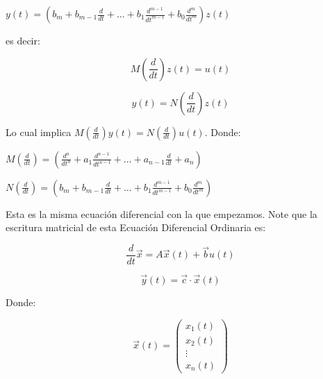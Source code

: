     \begin{math}
        y(t) = \left( b_m + b_{m-1} \frac{d}{dt} + \dots + b_1 \frac{d^{m-1}}{dt^{m-1}} + b_0 \frac{d^m}{dt^m} \right) z(t)
    \end{math}

    es decir:

    \begin{equation}
        M \left( \frac{d}{dt} \right) z(t) = u(t)
    \end{equation}

    \begin{equation}
        y(t) = N \left( \frac{d}{dt} \right) z(t)
    \end{equation}

    Lo cual implica $M \left( \frac{d}{dt} \right) y(t) = N \left( \frac{d}{dt} \right) u(t)$. Donde:

    \begin{math}
        M \left( \frac{d}{dt} \right) = \left( \frac{d^n}{dt^n} + a_1 \frac{d^{n-1}}{dt^{n-1}} + \dots + a_{n-1} \frac{d}{dt} + a_n \right)
    \end{math}

    \begin{math}
        N \left( \frac{d}{dt} \right) = \left( b_m + b_{m-1} \frac{d}{dt} + \dots + b_1 \frac{d^{m-1}}{dt^{m-1}} + b_0 \frac{d^m}{dt^m} \right)
    \end{math}

    Esta es la misma ecuación diferencial con la que empezamos. Note que la escritura matricial de esta Ecuación Diferencial Ordinaria es:

    \begin{equation}
        \frac{d}{dt} \vec{x} = A \vec{x}(t) + \vec{b} u(t)
    \end{equation}

    \begin{equation}
        \vec{y}(t) = \vec{c} \cdot \vec{x}(t)
    \end{equation}

    Donde:

    \begin{equation}
        \vec{x}(t) =
        \begin{pmatrix}
        x_1(t) \\
        x_2(t) \\
        \vdots \\
        x_n(t)
        \end{pmatrix}
    \end{equation}

